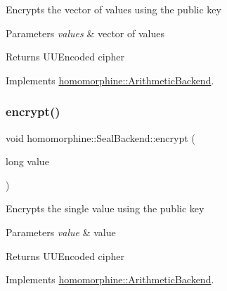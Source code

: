 Encrypts the vector of values using the public key


\begin{DoxyParams}{Parameters}
{\em values} & vector of values \\
\hline
\end{DoxyParams}
\begin{DoxyReturn}{Returns}
U\+U\+Encoded cipher 
\end{DoxyReturn}


Implements \mbox{\hyperlink{classhomomorphine_1_1_arithmetic_backend_a684c16673191eb5f7c6400f3d34cbcc1}{homomorphine\+::\+Arithmetic\+Backend}}.

\mbox{\label{classhomomorphine_1_1_seal_backend_aa0815bdb369e3802140efc722a811112}} 
\subsubsection{\texorpdfstring{encrypt()}{encrypt()}\hspace{0.1cm}{\footnotesize\ttfamily [2/2]}}
{\footnotesize\ttfamily void homomorphine\+::\+Seal\+Backend\+::encrypt (\begin{DoxyParamCaption}\item[{long}]{value }\end{DoxyParamCaption})\hspace{0.3cm}{\ttfamily [virtual]}}

Encrypts the single value using the public key


\begin{DoxyParams}{Parameters}
{\em value} & value \\
\hline
\end{DoxyParams}
\begin{DoxyReturn}{Returns}
U\+U\+Encoded cipher 
\end{DoxyReturn}


Implements \mbox{\hyperlink{classhomomorphine_1_1_arithmetic_backend_abdf6100f3d87580c942526027823fdb1}{homomorphine\+::\+Arithmetic\+Backend}}.

\mbox{\label{classhomomorphine_1_1_seal_backend_a1e2ed46b896d4a5b5d930ec7bcd3207b}} 
